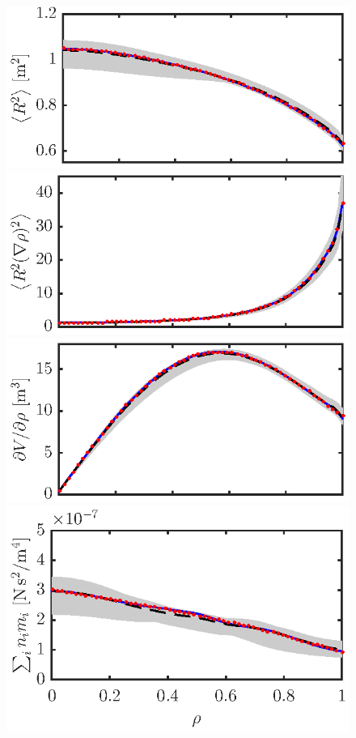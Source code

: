 \documentclass{iopart}
\begin{document}
\begin{figure} 
\includegraphics{fig1a} \hspace{-3em} \\
\includegraphics{fig1b} \hspace{-3em} \\
\includegraphics{fig1c} \hspace{-3em} \\[-.4em]
\includegraphics{fig1d} \hspace{-3em}

\end{figure}
\end{document}
